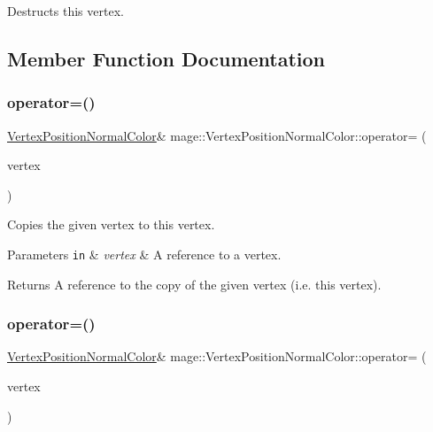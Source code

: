Destructs this vertex. 

\subsection{Member Function Documentation}
\hypertarget{structmage_1_1_vertex_position_normal_color_aff39199b81977d3479976c83f7f51a4f}{}\label{structmage_1_1_vertex_position_normal_color_aff39199b81977d3479976c83f7f51a4f} 
\subsubsection{\texorpdfstring{operator=()}{operator=()}\hspace{0.1cm}{\footnotesize\ttfamily [1/2]}}
{\footnotesize\ttfamily \hyperlink{structmage_1_1_vertex_position_normal_color}{Vertex\+Position\+Normal\+Color}\& mage\+::\+Vertex\+Position\+Normal\+Color\+::operator= (\begin{DoxyParamCaption}\item[{const \hyperlink{structmage_1_1_vertex_position_normal_color}{Vertex\+Position\+Normal\+Color} \&}]{vertex }\end{DoxyParamCaption})\hspace{0.3cm}{\ttfamily [default]}}

Copies the given vertex to this vertex.


\begin{DoxyParams}[1]{Parameters}
\mbox{\tt in}  & {\em vertex} & A reference to a vertex. \\
\hline
\end{DoxyParams}
\begin{DoxyReturn}{Returns}
A reference to the copy of the given vertex (i.\+e. this vertex). 
\end{DoxyReturn}
\hypertarget{structmage_1_1_vertex_position_normal_color_a81420d3cad27061049fe23bf4aaba64f}{}\label{structmage_1_1_vertex_position_normal_color_a81420d3cad27061049fe23bf4aaba64f} 
\subsubsection{\texorpdfstring{operator=()}{operator=()}\hspace{0.1cm}{\footnotesize\ttfamily [2/2]}}
{\footnotesize\ttfamily \hyperlink{structmage_1_1_vertex_position_normal_color}{Vertex\+Position\+Normal\+Color}\& mage\+::\+Vertex\+Position\+Normal\+Color\+::operator= (\begin{DoxyParamCaption}\item[{\hyperlink{structmage_1_1_vertex_position_normal_color}{Vertex\+Position\+Normal\+Color} \&\&}]{vertex }\end{DoxyParamCaption})\hspace{0.3cm}{\ttfamily [default]}}

